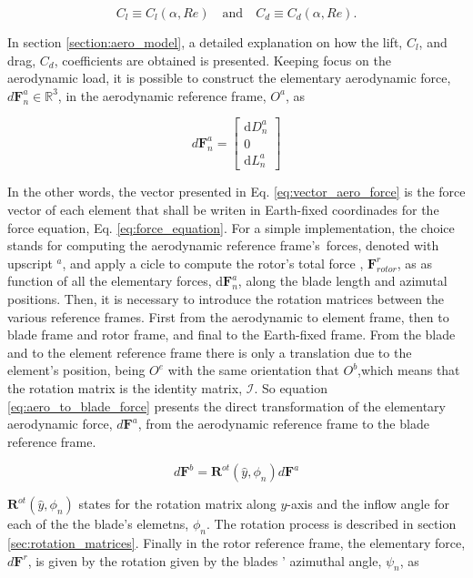 \begin{equation}
    C_l \equiv C_l(\alpha, Re) \quad \text{and} \quad C_d\equiv C_d(\alpha, Re).
\end{equation}

In section \ref{section:aero_model}, a detailed explanation on how the lift, $C_l$, and drag, $C_d$, coefficients are obtained is presented. Keeping focus on the aerodynamic load, it is possible to construct the elementary aerodynamic force, $d\mathbf{F}^a_n \in \mathbb{R}^3$, in the aerodynamic reference frame, $O^a$, as

\begin{equation}
    d\mathbf{F}^a_n = \begin{bmatrix}
        \mathrm{d}D^a_n \\ 0 \\ \mathrm{d}L^a_n
    \end{bmatrix}
    \label{eq:vector_aero_force}
\end{equation}

In the other words, the vector presented in Eq. \ref{eq:vector_aero_force} is the force vector of each element that shall be writen in Earth-fixed coordinades for the force equation, Eq. \ref{eq:force_equation}. For a simple implementation, the choice stands for computing the aerodynamic reference frame's\ forces, denoted with upscript $^a$, and apply a cicle to compute the rotor's total force , $\mathbf{F}^r_{rotor}$, as as function of all the elementary forces, $\mathrm{d}\mathbf{F}^a_n$, along the blade length and azimutal positions. Then, it is necessary to introduce the rotation matrices between the various reference frames. First from the aerodynamic to element frame, then to blade frame and rotor frame, and final to the Earth-fixed frame. From the blade and to the element reference frame there is only a translation due to the element's position, being $O^e$ with the same orientation that $O^b$,which means that the rotation matrix is the identity matrix, $\boldsymbol{\mathcal{I}}$. So equation \ref{eq:aero_to_blade_force} presents the direct transformation of the elementary aerodynamic force, $d\mathbf{F}^a$, from the aerodynamic reference frame to the blade reference frame.

\begin{equation}
    d\mathbf{F}^b = \boldsymbol{R}^{ot}(\hat{y}, \phi_n) d\mathbf{F}^a
    \label{eq:aero_to_blade_force}
\end{equation}

$\boldsymbol{R}^{ot}(\hat{y}, \phi_n)$ states for the rotation matrix along $y$-axis and the inflow angle for each of the the blade's elemetns, $\phi_n$. The rotation process is described in section \ref{sec:rotation_matrices}. Finally in the rotor reference frame, the elementary force, $d\mathbf{F}^r$, is given by the rotation given by the blades ' azimuthal angle, $\psi_n$, as

